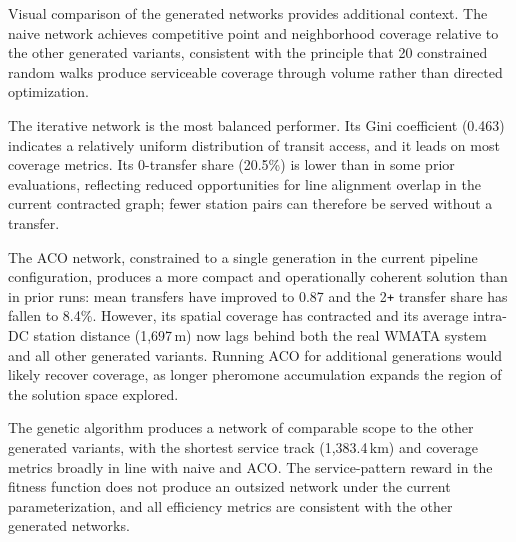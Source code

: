 \documentclass[sigconf,nonacm]{acmart}
\begin{document}
\begin{table}[h]
\caption{Sample Transit Times for Selected Origin-Destination Pairs}
\label{tab:transittimes}
\end{table}

Visual comparison of the generated networks provides additional context. The naive network achieves competitive point and neighborhood coverage relative to the other generated variants, consistent with the principle that 20 constrained random walks produce serviceable coverage through volume rather than directed optimization.

The iterative network is the most balanced performer. Its Gini coefficient (0.463) indicates a relatively uniform distribution of transit access, and it leads on most coverage metrics. Its 0-transfer share (20.5\%) is lower than in some prior evaluations, reflecting reduced opportunities for line alignment overlap in the current contracted graph; fewer station pairs can therefore be served without a transfer.

The ACO network, constrained to a single generation in the current pipeline configuration, produces a more compact and operationally coherent solution than in prior runs: mean transfers have improved to 0.87 and the 2\texttt{+} transfer share has fallen to 8.4\%. However, its spatial coverage has contracted and its average intra-DC station distance (1,697\,m) now lags behind both the real WMATA system and all other generated variants. Running ACO for additional generations would likely recover coverage, as longer pheromone accumulation expands the region of the solution space explored.

The genetic algorithm produces a network of comparable scope to the other generated variants, with the shortest service track (1,383.4\,km) and coverage metrics broadly in line with naive and ACO. The service-pattern reward in the fitness function does not produce an outsized network under the current parameterization, and all efficiency metrics are consistent with the other generated networks.
\end{document}
